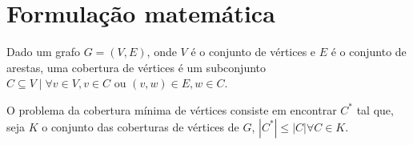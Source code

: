 \section{Formulação matemática}
\label{sec:formulacao}

Dado um grafo $G = (V, E)$, onde $V$ é o conjunto de vértices e $E$ é
o conjunto de arestas, uma cobertura de vértices é um subconjunto $C
\subseteq V \mid \forall v \in V, v \in C \mbox{ ou } (v,w) \in E, w
\in C$.

O problema da cobertura mínima de vértices consiste em encontrar $C^*$
tal que, seja $K$ o conjunto das coberturas de vértices de $G$,
    $\left| C^* \right|
\leq \left| C \right| \forall C \in K$.
